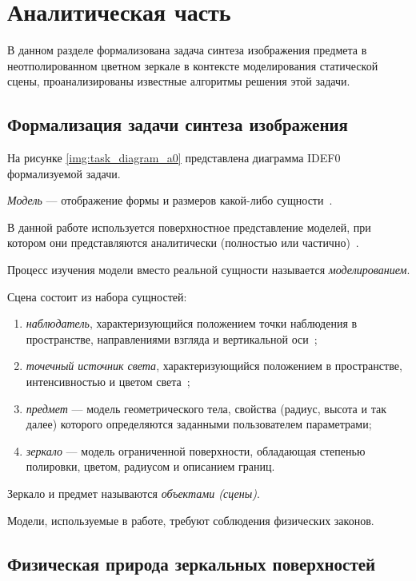 \chapter{Аналитическая часть}

В данном разделе формализована задача синтеза изображения предмета в неотполированном цветном зеркале в контексте моделирования статической сцены, проанализированы известные алгоритмы решения этой задачи.

\section{Формализация задачи синтеза изображения}

На рисунке \ref{img:task_diagram_a0} представлена диаграмма IDEF0 формализуемой задачи.


\textit{Модель} --- отображение формы и размеров какой-либо сущности~\cite{куров}.

В данной работе используется поверхностное представление моделей, при котором они представляются аналитически (полностью или частично)~\cite{куров}.

Процесс изучения модели вместо реальной сущности называется \textit{моделированием}.

Сцена состоит из набора сущностей:
\begin{enumerate}
	\item \textit{наблюдатель}, характеризующийся положением точки наблюдения в пространстве, направлениями взгляда и вертикальной оси~\cite{куров};
	\item \textit{точечный источник света}, характеризующийся положением в пространстве, интенсивностью и цветом света~\cite{куров};
	\item \textit{предмет} --- модель геометрического тела, свойства (радиус, высота и так далее) которого определяются заданными пользователем параметрами;
	\item \textit{зеркало} --- модель ограниченной поверхности, обладающая степенью полировки, цветом, радиусом и описанием границ.
\end{enumerate}

Зеркало и предмет называются \textit{объектами (сцены)}.

Модели, используемые в работе, требуют соблюдения физических законов.

\section{Физическая природа зеркальных поверхностей}

